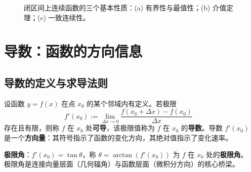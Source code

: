 \begin{figure}[htbp]
\caption{闭区间上连续函数的三个基本性质：(a) 有界性与最值性；(b) 介值定理；(c) 一致连续性。}
\label{fig:closed_interval_continuity}
\end{figure}

\section{\texorpdfstring{导数：函数的方向信息}{导数：函数的方向信息}}

\subsection{\texorpdfstring{导数的定义与求导法则}{导数的定义与求导法则}}

\begin{definition}[导数与极限角]\label{def:derivative}
设函数 $y = f(x)$ 在点 $x_0$ 的某个邻域内有定义。若极限
\[f'(x_0) := \lim_{\Delta x \to 0} \frac{f(x_0 + \Delta x) - f(x_0)}{\Delta x}\]
存在且有限，则称 $f$ 在 $x_0$ 处\textbf{可导}，该极限值称为 $f$ 在 $x_0$ 的\textbf{导数}。导数 $f'(x_0)$ 是一个\textbf{方向量}：其符号指示了函数的变化方向，其绝对值指示了变化速率。

\textbf{极限角}：$f'(x_0) = \tan\theta$，称 $\theta = \arctan(f'(x_0))$ 为 $f$ 在 $x_0$ 处的\textbf{极限角}。极限角是连接向量层面（几何辐角）与函数层面（微积分方向）的核心桥梁。
\end{definition}

